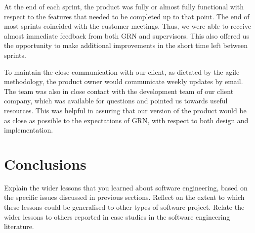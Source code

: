 \documentclass{l3proj}
\begin{document}
 At the end of each sprint, the product was fully or almost fully functional with respect to the features that needed to be completed up to that point. The end of most sprints coincided with the customer meetings. Thus, we were able to receive almost immediate feedback from both GRN and supervisors. This also offered us the opportunity to make additional improvements in the short time left between sprints.
 
 To maintain the close communication with our client, as dictated by the agile methodology, the product owner would communicate weekly updates by email. The team was also in close contact with the development team of our client company, which was available for questions and pointed us towards useful resources. This was helpful in assuring that our version of the product would be as close as possible to the expectations of GRN, with respect to both design and implementation.
 
 
 
\newpage
\section{Conclusions}
\label{sec:conclusion}


Explain the wider lessons that you learned about software engineering,
based on the specific issues discussed in previous sections.  Reflect
on the extent to which these lessons could be generalised to other
types of software project.  Relate the wider lessons to others
reported in case studies in the software engineering literature.



\end{document}

